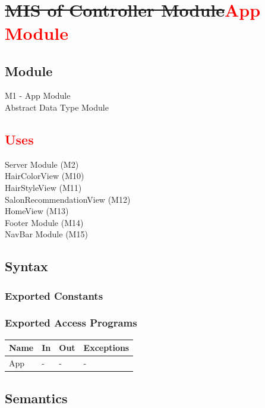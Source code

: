 \documentclass[12pt, titlepage]{article}
\begin{document}
~\newpage

\section{\sout{MIS of Controller Module}\textcolor{red}{App Module}}

\subsection{Module}
M1 - App Module \\
Abstract Data Type Module

\subsection{\textcolor{red}{Uses}}
Server Module (M2) \\
HairColorView (M10) \\
HairStyleView (M11) \\
SalonRecommendationView (M12) \\
HomeView (M13) \\
Footer Module (M14) \\
NavBar Module (M15) \\

\subsection{Syntax}

\subsubsection{Exported Constants}

\subsubsection{Exported Access Programs}

\begin{center}
\begin{tabular}{p{5cm} p{3cm} p{3cm} p{2cm}}
\hline
\textbf{Name} & \textbf{In} & \textbf{Out} & \textbf{Exceptions} \\
\hline
App & - & - & - \\
\hline
\end{tabular}
\end{center}

\subsection{Semantics}
\end{document}
